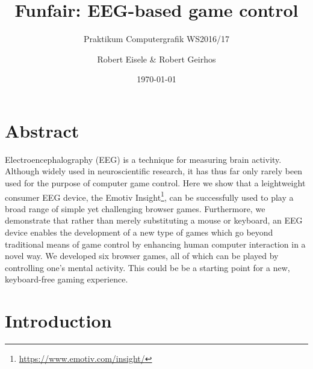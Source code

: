 \documentclass{utue} %
\title{Funfair: EEG-based game control}
\author{Robert Eisele \& Robert Geirhos}
\date{\today}
\subtitle{Praktikum Computergrafik WS2016/17}
\begin{document}

\maketitle

\section*{Abstract}


Electroencephalography (EEG) is a technique for measuring brain activity. Although widely used in neuroscientific research, it has thus far only rarely been used for the purpose of computer game control. Here we show that a leightweight consumer EEG device, the Emotiv Insight\footnote{\url{https://www.emotiv.com/insight/}}, can be successfully used to play a broad range of simple yet challenging browser games. Furthermore, we demonstrate that rather than merely substituting a mouse or keyboard, an EEG device enables the development of a new type of games which go beyond traditional means of game control by enhancing human computer interaction in a novel way. We developed six browser games, all of which can be played by controlling one's mental activity. This could be be a starting point for a new, keyboard-free gaming experience.

\section{Introduction}
\end{document}
